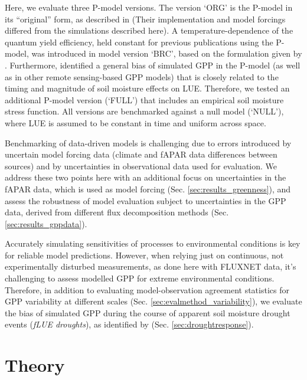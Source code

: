 \documentclass{myreport}
\begin{document}
Here, we evaluate three P-model versions. The version `ORG' is the P-model in its ``original'' form, as described in \cite{wang17natpl} (Their implementation and model forcings differed from the simulations described here). A temperature-dependence of the quantum yield efficiency, held constant for previous publications using the P-model, was introduced in model version `BRC', based on the formulation given by \cite{bernacchi03pce}. Furthermore, \cite{stocker19natgeo} identified a general bias of simulated GPP in the P-model (as well as in other remote sensing-based GPP models) that is closely related to the timing and magnitude of soil moisture effects on LUE. Therefore, we tested an additional P-model version (`FULL') that includes an empirical soil moisture stress function. All versions are benchmarked against a null model (`NULL'), where LUE is assumed to be constant in time and uniform across space. %

Benchmarking of data-driven models is challenging due to errors introduced by uncertain model forcing data \citep{ryu19rse} (climate and fAPAR data differences between sources) and by uncertainties in observational data used for evaluation. We address these two points here with an additional focus on uncertainties in the fAPAR data, which is used as model forcing (Sec. \ref{sec:results_greenness}), and assess the robustness of model evaluation subject to uncertainties in the GPP data, derived from different flux decomposition methods (Sec. \ref{sec:results_gppdata}). 

Accurately simulating sensitivities of processes to environmental conditions is key for reliable model predictions. However, when relying just on continuous, not experimentally disturbed measurements, as done here with FLUXNET data, it's challenging to assess modelled GPP for extreme environmental conditions. Therefore, in addition to evaluating model-observation agreement statistics for GPP variability at different scales (Sec. \ref{sec:evalmethod_variability}), we evaluate the bias of simulated GPP during the course of apparent soil moisture drought events (\textit{fLUE droughts}), as identified by \cite{stocker18newphyt} (Sec. \ref{sec:droughtresponse}).

\section{Theory}
\label{sec:theory}
\end{document}
